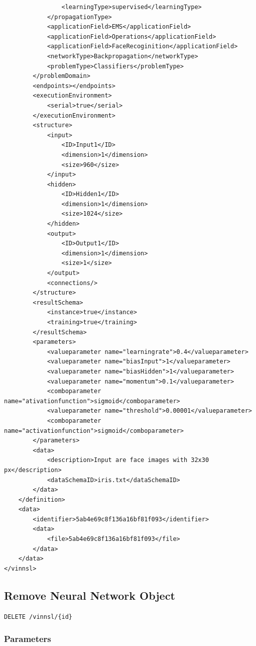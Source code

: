 \begin{verbatim}
                <learningType>supervised</learningType>
            </propagationType>
            <applicationField>EMS</applicationField>
            <applicationField>Operations</applicationField>
            <applicationField>FaceRecoginition</applicationField>
            <networkType>Backpropagation</networkType>
            <problemType>Classifiers</problemType>
        </problemDomain>
        <endpoints></endpoints>
        <executionEnvironment>
            <serial>true</serial>
        </executionEnvironment>
        <structure>
            <input>
                <ID>Input1</ID>
                <dimension>1</dimension>
                <size>960</size>
            </input>
            <hidden>
                <ID>Hidden1</ID>
                <dimension>1</dimension>
                <size>1024</size>
            </hidden>
            <output>
                <ID>Output1</ID>
                <dimension>1</dimension>
                <size>1</size>
            </output>
            <connections/>
        </structure>
        <resultSchema>
            <instance>true</instance>
            <training>true</training>
        </resultSchema>
        <parameters>
            <valueparameter name="learningrate">0.4</valueparameter>
            <valueparameter name="biasInput">1</valueparameter>
            <valueparameter name="biasHidden">1</valueparameter>
            <valueparameter name="momentum">0.1</valueparameter>
            <comboparameter name="ativationfunction">sigmoid</comboparameter>
            <valueparameter name="threshold">0.00001</valueparameter>
            <comboparameter name="activationfunction">sigmoid</comboparameter>
        </parameters>
        <data>
            <description>Input are face images with 32x30 px</description>
            <dataSchemaID>iris.txt</dataSchemaID>
        </data>
    </definition>
    <data>
        <identifier>5ab4e69c8f136a16bf81f093</identifier>
        <data>
            <file>5ab4e69c8f136a16bf81f093</file>
        </data>
    </data>
</vinnsl>
\end{verbatim}

\subsection{Remove Neural Network
Object}\label{remove-neural-network-object}

\begin{verbatim}
DELETE /vinnsl/{id}
\end{verbatim}

\subsubsection{Parameters}\label{parameters-3}

